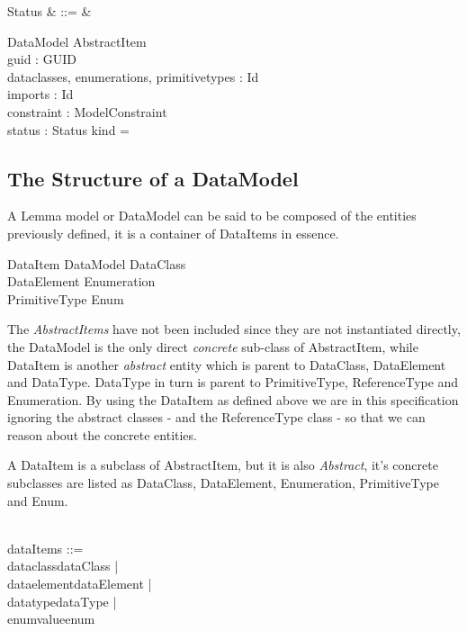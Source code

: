 \documentclass[a4paper,twoside]{article}
\def\datamodel{\mathsf{datamodel}}
\def\draft{\mathsf{draft}}
\def\final{\mathsf{final}}
\begin{document}
\begin{syntax}
	Status & ::= & \draft \mid \final 
\end{syntax}

\begin{schema}{DataModel}
	AbstractItem \\
	guid : GUID \\
	dataclasses, enumerations, primitivetypes : \power Id \\
	imports : \power Id \\
	constraint : ModelConstraint \\
	status : Status 
	\where
	kind = \datamodel
\end{schema}


\subsection{The Structure of a DataModel}

A Lemma model or DataModel can be said to be composed of the entities previously defined, it is a container of DataItems in essence.

\begin{zed}
	DataItem  DataModel \lor DataClass \\ \lor DataElement \lor Enumeration \\ \lor PrimitiveType  \lor Enum
\end{zed}

The \emph{AbstractItems} have not been included since they are not instantiated directly, the DataModel is the only direct \emph{concrete} sub-class of AbstractItem, while DataItem is another \emph{abstract} entity which is parent to DataClass, DataElement and DataType. DataType in turn is parent to PrimitiveType, ReferenceType and Enumeration.  By using the DataItem as defined above we are in this specification ignoring the abstract classes - and the ReferenceType class - so that we can reason about the concrete entities.

A DataItem is a subclass of AbstractItem, but it is also \emph{Abstract}, it's concrete subclasses are listed as DataClass, DataElement, Enumeration, PrimitiveType and Enum.

\begin{zed}
	\\
	dataItems ::= \\
	dataclass\ldata dataClass \rdata | \\
	dataelement\ldata dataElement \rdata | \\
	datatype\ldata dataType \rdata | \\
	enumvalue\ldata enum \rdata
\end{zed}
\end{document}
